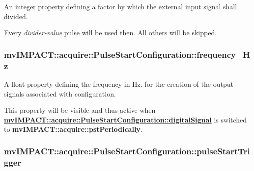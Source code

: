 An integer property defining a factor by which the external input signal shall divided. 

Every {\itshape divider-\/value} pulse will be used then. All others will be skipped. \hypertarget{classmv_i_m_p_a_c_t_1_1acquire_1_1_pulse_start_configuration_a7e844230a702212a0c0927eb7adecef6}{
\subsubsection[{frequency\+\_\+\+Hz}]{ mv\+I\+M\+P\+A\+C\+T\+::acquire\+::\+Pulse\+Start\+Configuration\+::frequency\+\_\+\+Hz}}\label{classmv_i_m_p_a_c_t_1_1acquire_1_1_pulse_start_configuration_a7e844230a702212a0c0927eb7adecef6}


A float property defining the frequency in Hz. for the creation of the output signals associated with configuration. 

This property will be visible and thus active when {\bfseries \hyperlink{classmv_i_m_p_a_c_t_1_1acquire_1_1_pulse_start_configuration_a5cf89b1d644e0ba87fa1a254f7d2a0df}{mv\+I\+M\+P\+A\+C\+T\+::acquire\+::\+Pulse\+Start\+Configuration\+::digital\+Signal}} is switched to {\bfseries mv\+I\+M\+P\+A\+C\+T\+::acquire\+::pst\+Periodically}. \hypertarget{classmv_i_m_p_a_c_t_1_1acquire_1_1_pulse_start_configuration_a0c71f34ee55702d9ef0902a3c49770cf}{
\subsubsection[{pulse\+Start\+Trigger}]{ mv\+I\+M\+P\+A\+C\+T\+::acquire\+::\+Pulse\+Start\+Configuration\+::pulse\+Start\+Trigger}}\label{classmv_i_m_p_a_c_t_1_1acquire_1_1_pulse_start_configuration_a0c71f34ee55702d9ef0902a3c49770cf}


